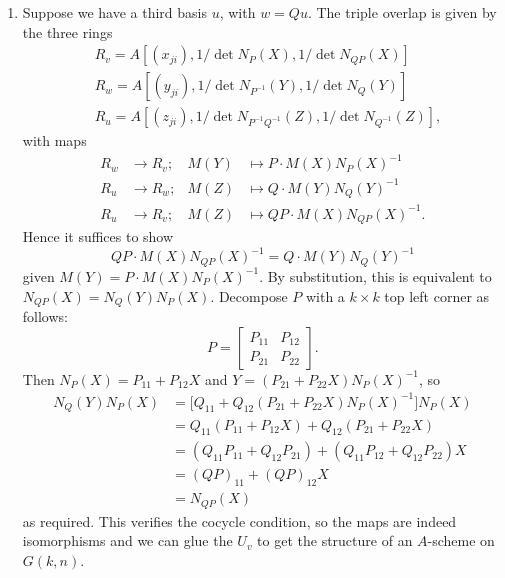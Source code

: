 \documentclass{report}
\begin{document}
\begin{enumerate}[label=\textbf{6.7.\Alph*.}]
	\item Suppose we have a third basis $u$, with $w=Qu$. The triple overlap is
	      given by the three rings
	      \begin{align*}
		       & R_v = A[(x_{ji}),1/\det N_P(X),1/\det N_{QP}(X)]                   \\
		       & R_w = A[(y_{ji}),1/\det N_{P^{-1}}(Y),1/\det N_Q(Y)]               \\
		       & R_u = A[(z_{ji}),1/\det N_{P^{-1}Q^{-1}}(Z),1/\det N_{Q^{-1}}(Z)],
	      \end{align*}
	      with maps
	      \begin{align*}
		      R_w & \to R_v; & M(Y) & \mapsto P\cdot M(X)N_P(X)^{-1}      \\
		      R_u & \to R_w; & M(Z) & \mapsto Q\cdot M(Y)N_Q(Y)^{-1}      \\
		      R_u & \to R_v; & M(Z) & \mapsto QP\cdot M(X)N_{QP}(X)^{-1}.
	      \end{align*}
	      Hence it suffices to show
	      \begin{equation*}
		      QP\cdot M(X)N_{QP}(X)^{-1} = Q\cdot M(Y)N_Q(Y)^{-1}
	      \end{equation*}
	      given $M(Y)=P\cdot M(X)N_P(X)^{-1}$. By substitution, this is equivalent
	      to $N_{QP}(X)=N_Q(Y)N_P(X)$. Decompose $P$ with a $k\times k$ top left
	      corner as follows:
	      \begin{equation*}
		      P =
		      \left[\begin{array}{c|c}
				      P_{11} & P_{12} \\
				      \hline
				      P_{21} & P_{22}
			      \end{array}\right].
	      \end{equation*}
	      Then $N_P(X)=P_{11}+P_{12}X$ and $Y=(P_{21}+P_{22}X)N_P(X)^{-1}$, so
	      \begin{align*}
		      N_Q(Y)N_P(X)
		       & = \bigl[Q_{11} + Q_{12}(P_{21}+P_{22}X)N_P(X)^{-1}\bigr]N_P(X) \\
		       & = Q_{11}(P_{11}+P_{12}X) + Q_{12}(P_{21}+P_{22}X)              \\
		       & = (Q_{11}P_{11} + Q_{12}P_{21}) + (Q_{11}P_{12}+Q_{12}P_{22})X \\
		       & = (QP)_{11} + (QP)_{12}X                                       \\
		       & = N_{QP}(X)
	      \end{align*}
	      as required. This verifies the cocycle condition, so the maps are indeed
	      isomorphisms and we can glue the $U_v$ to get the structure of an
	      $A$-scheme on $G(k,n)$.
\end{enumerate}
\end{document}
